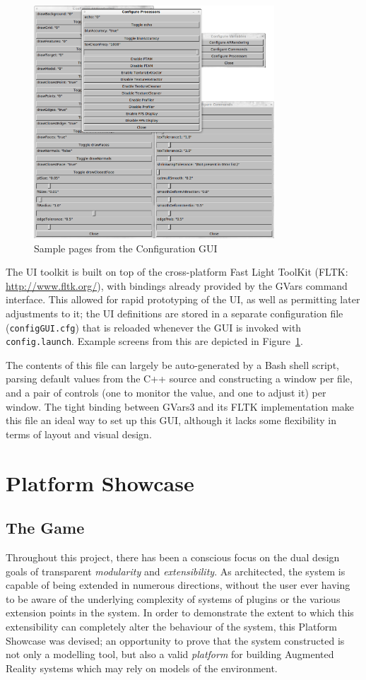 \documentclass[a4paper,10pt]{article}
\begin{document}
\begin{figure}
  \begin{center}
    \includegraphics[width=340px]{Config}
  \end{center}
  \caption{Sample pages from the Configuration GUI}
  \label{configui}
\end{figure}

The UI toolkit is built on top of the cross-platform Fast Light ToolKit (FLTK: \url{http://www.fltk.org/}), with bindings already provided by the GVars command interface. This allowed for rapid prototyping of the UI, as well as permitting later adjustments to it; the UI definitions are stored in a separate configuration file (\texttt{configGUI.cfg}) that is reloaded whenever the GUI is invoked with \texttt{config.launch}. Example screens from this are depicted in Figure~\ref{configui}.

The contents of this file can largely be auto-generated by a Bash shell script, parsing default values from the C++ source and constructing a window per file, and a pair of controls (one to monitor the value, and one to adjust it) per window. The tight binding between GVars3 and its FLTK implementation make this file an ideal way to set up this GUI, although it lacks some flexibility in terms of layout and visual design.

\clearpage

\section{Platform Showcase}
\subsection{The Game}
Throughout this project, there has been a conscious focus on the dual design goals of transparent \textit{modularity} and \textit{extensibility}. As architected, the system is capable of being extended in numerous directions, without the user ever having to be aware of the underlying complexity of systems of plugins or the various extension points in the system. In order to demonstrate the extent to which this extensibility can completely alter the behaviour of the system, this Platform Showcase was devised; an opportunity to prove that the system constructed is not only a modelling tool, but also a valid \textit{platform} for building Augmented Reality systems which may rely on models of the environment.
\end{document}
